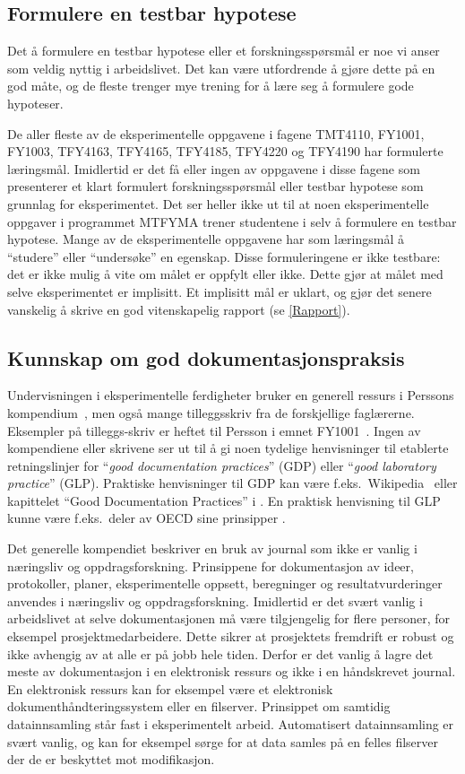 \documentclass{article}
\begin{document}
\subsection{Formulere en testbar hypotese}
Det å formulere en testbar hypotese eller et forskningsspørsmål er noe vi anser som veldig nyttig i arbeidslivet. Det kan være utfordrende å gjøre dette på en god måte, og de fleste trenger mye trening for å lære seg å formulere gode hypoteser.

De aller fleste av de eksperimentelle oppgavene i fagene TMT4110, FY1001, FY1003, TFY4163, TFY4165, TFY4185, TFY4220 og TFY4190 har formulerte læringsmål. Imidlertid er det få eller ingen av oppgavene i disse fagene som presenterer et klart formulert forskningsspørsmål eller testbar hypotese som grunnlag for eksperimentet. Det ser heller ikke ut til at noen eksperimentelle oppgaver i programmet MTFYMA trener studentene i selv å formulere en testbar hypotese. Mange av de eksperimentelle oppgavene har som læringsmål å ``studere'' eller ``undersøke'' en egenskap. Disse formuleringene er ikke testbare: det er ikke mulig å vite om målet er oppfylt eller ikke. Dette gjør at målet med selve eksperimentet er implisitt. Et implisitt mål er uklart, og gjør det senere vanskelig å skrive en god vitenskapelig rapport (se \cref{Rapport}).

\subsection{Kunnskap om god dokumentasjonspraksis}
Undervisningen i eksperimentelle ferdigheter bruker en generell ressurs i Perssons kompendium~\cite{Persson2020}, men også mange tilleggsskriv fra de forskjellige faglærerne. Eksempler på tilleggs-skriv er heftet til Persson i emnet FY1001~\cite{Persson2020FY1001}. Ingen av kompendiene eller skrivene ser ut til å gi noen tydelige henvisninger til etablerte retningslinjer for ``\emph{good documentation practices}'' (GDP) eller ``\emph{good laboratory practice}'' (GLP). Praktiske henvisninger til GDP kan være f.eks.~Wikipedia~\cite{WikiGDP} eller kapittelet ``Good Documentation Practices'' i \cite{Davani2017}. En praktisk henvisning til GLP kunne være f.eks.~deler av OECD sine prinsipper \cite{OECD1997}.

Det generelle kompendiet \cite{Persson2020} beskriver en bruk av journal som ikke er vanlig i næringsliv og oppdragsforskning. Prinsippene for dokumentasjon av ideer, protokoller, planer, eksperimentelle oppsett, beregninger og resultatvurderinger anvendes i næringsliv og oppdragsforskning. Imidlertid er det svært vanlig i arbeidslivet at selve dokumentasjonen må være tilgjengelig for flere personer, for eksempel prosjektmedarbeidere. Dette sikrer at prosjektets fremdrift er robust og ikke avhengig av at alle er på jobb hele tiden. Derfor er det vanlig å lagre det meste av dokumentasjon i en elektronisk ressurs og ikke i en håndskrevet journal. En elektronisk ressurs kan for eksempel være et elektronisk dokumenthåndteringssystem eller en filserver. Prinsippet om samtidig datainnsamling står fast i eksperimentelt arbeid. Automatisert datainnsamling er svært vanlig, og kan for eksempel sørge for at data samles på en felles filserver der de er beskyttet mot modifikasjon.
\end{document}
